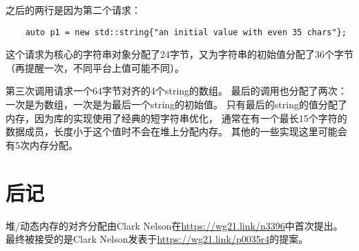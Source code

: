 之后的两行是因为第二个请求：
\begin{lstlisting}
    auto p1 = new std::string{"an initial value with even 35 chars"};
\end{lstlisting}
这个请求为核心的字符串对象分配了24字节，又为字符串的初始值分配了36个字节
（再提醒一次，不同平台上值可能不同）。

第三次调用请求一个64字节对齐的4个string的数组。
最后的调用也分配了两次：一次是为数组，一次是为最后一个string的初始值。
只有最后的string的值分配了内存，因为库的实现使用了经典的短字符串优化，
通常在有一个最长15个字符的数据成员，长度小于这个值时不会在堆上分配内存。
其他的一些实现这里可能会有5次内存分配。


\section{后记}
堆/动态内存的对齐分配由Clark Nelson在\url{https://wg21.link/n3396}中首次提出。
最终被接受的是Clark Nelson发表于\url{https://wg21.link/p0035r4}的提案。